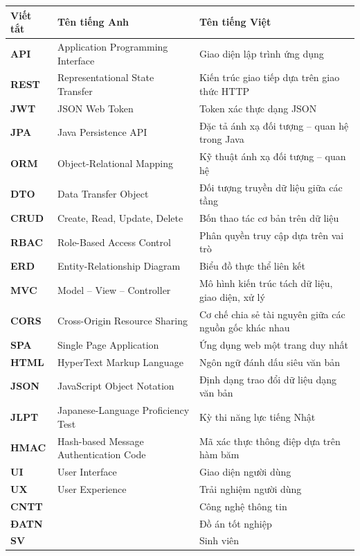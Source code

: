 \documentclass[../DoAn.tex]{subfiles}
\begin{document}
\begin{longtable}{p{1.6cm} p{6cm} p{6.5cm}}
	\hline
   \textbf{Viết tắt}  & \textbf{Tên tiếng Anh}	& \textbf{Tên tiếng Việt} \\ \hline
	\textbf{API} & Application Programming Interface & Giao diện lập trình ứng dụng\\
	\textbf{REST} & Representational State Transfer & Kiến trúc giao tiếp dựa trên giao thức HTTP\\
	\textbf{JWT} & JSON Web Token & Token xác thực dạng JSON\\
	\textbf{JPA} & Java Persistence API & Đặc tả ánh xạ đối tượng -- quan hệ trong Java\\
	\textbf{ORM} & Object-Relational Mapping & Kỹ thuật ánh xạ đối tượng -- quan hệ\\
	\textbf{DTO} & Data Transfer Object & Đối tượng truyền dữ liệu giữa các tầng\\
	\textbf{CRUD} & Create, Read, Update, Delete & Bốn thao tác cơ bản trên dữ liệu\\
	\textbf{RBAC} & Role-Based Access Control & Phân quyền truy cập dựa trên vai trò\\
	\textbf{ERD} & Entity-Relationship Diagram & Biểu đồ thực thể liên kết\\
	\textbf{MVC} & Model -- View -- Controller & Mô hình kiến trúc tách dữ liệu, giao diện, xử lý\\
	\textbf{CORS} & Cross-Origin Resource Sharing & Cơ chế chia sẻ tài nguyên giữa các nguồn gốc khác nhau\\
	\textbf{SPA} & Single Page Application & Ứng dụng web một trang duy nhất\\
	\textbf{HTML} & HyperText Markup Language & Ngôn ngữ đánh dấu siêu văn bản\\
	\textbf{JSON} & JavaScript Object Notation & Định dạng trao đổi dữ liệu dạng văn bản\\
	\textbf{JLPT} & Japanese-Language Proficiency Test & Kỳ thi năng lực tiếng Nhật\\
	\textbf{HMAC} & Hash-based Message Authentication Code & Mã xác thực thông điệp dựa trên hàm băm\\
	\textbf{UI} & User Interface & Giao diện người dùng\\
	\textbf{UX} & User Experience & Trải nghiệm người dùng\\
	\textbf{CNTT }  &   & Công nghệ thông tin\\
	\textbf{ĐATN} &  & Đồ án tốt nghiệp \\
	\textbf{SV} &  & Sinh viên \\
    \hline
\end{longtable}
\end{document}
